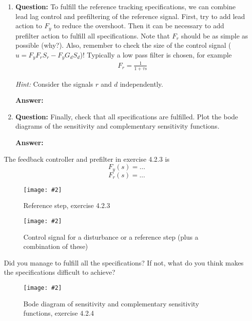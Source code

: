 \documentclass[11pt,a4paper]{article}
\newcommand{\image}[3]{
	\begin{figure}[!ht]
		\centering
	    \texttt{[image: \#2]}
		\caption{#3}
		\label{fig:#2}
	\end{figure}
}
\begin{document}
\begin{enumerate}[(1)]
	\item \textbf{Question:} To fulfill the reference tracking specifications, we can combine lead lag control and prefiltering of the reference signal. First, try to add lead action to $F_y$ to reduce the overshoot. Then it can be necessary to add prefilter action to fulfill all specifications. Note that $F_r$ should be as simple as possible (why?). Also, remember to check the size of the control signal ($u = F_y F_r S_r - F_y G_d S_d$)! Typically a low pass filter is chosen, for example
	\begin{align*}
		F_{r} = \frac{1}{1+\tau s}
	\end{align*}
	\par \textit{Hint:} Consider the signals $r$ and $d$ independently.
	\par \textbf{Answer:}
	
	\item \textbf{Question:} Finally, check that all specifications are fulfilled. Plot the bode diagrams of the sensitivity and complementary sensitivity functions.

	\par \textbf{Answer:} 
\end{enumerate}
	
	The feedback controller and prefilter in exercise 4.2.3 is 
	\[
	F_y(s) = \ldots
	\]
	\[
	F_r(s) = \ldots
	\]
	\image{0.25}{system}{Reference step, exercise 4.2.3}
	\image{0.25}{system}{Control signal for a disturbance or a reference step (plus a combination of these)}

	Did you manage to fulfill all the specifications? If not, what do you think makes the specifications difficult to achieve?
	\par\dotfill\par\dotfill\par
	
	\image{0.25}{system}{Bode diagram of sensitivity and complementary sensitivity functions, exercise 4.2.4}
\end{document}
